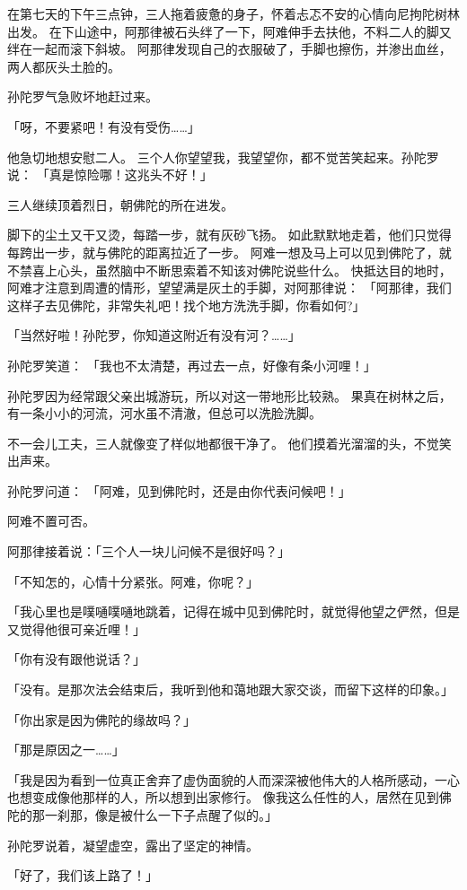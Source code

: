 \documentclass[twoside,openany]{book}
\begin{document}
在第七天的下午三点钟，三人拖着疲惫的身子，怀着忐忑不安的心情向尼拘陀树林出发。
在下山途中，阿那律被石头绊了一下，阿难伸手去扶他，不料二人的脚又绊在一起而滚下斜坡。
阿那律发现自己的衣服破了，手脚也擦伤，并渗出血丝，两人都灰头土脸的。

孙陀罗气急败坏地赶过来。

「呀，不要紧吧！有没有受伤……」

他急切地想安慰二人。
三个人你望望我，我望望你，都不觉苦笑起来。孙陀罗说：
「真是惊险哪！这兆头不好！」

三人继续顶着烈日，朝佛陀的所在进发。

脚下的尘土又干又烫，每踏一步，就有灰砂飞扬。
如此默默地走着，他们只觉得每跨出一步，就与佛陀的距离拉近了一步。
阿难一想及马上可以见到佛陀了，就不禁喜上心头，虽然脑中不断思索着不知该对佛陀说些什么。
快抵达目的地时，阿难才注意到周遭的情形，望望满是灰土的手脚，对阿那律说：
「阿那律，我们这样子去见佛陀，非常失礼吧！找个地方洗洗手脚，你看如何?」

「当然好啦！孙陀罗，你知道这附近有没有河？……」

孙陀罗笑道：
「我也不太清楚，再过去一点，好像有条小河哩！」

孙陀罗因为经常跟父亲出城游玩，所以对这一带地形比较熟。
果真在树林之后，有一条小小的河流，河水虽不清澈，但总可以洗脸洗脚。

不一会儿工夫，三人就像变了样似地都很干净了。
他们摸着光溜溜的头，不觉笑出声来。

孙陀罗问道：
「阿难，见到佛陀时，还是由你代表问候吧！」

阿难不置可否。

阿那律接着说：「三个人一块儿问候不是很好吗？」

「不知怎的，心情十分紧张。阿难，你呢？」

「我心里也是噗嗵噗嗵地跳着，记得在城中见到佛陀时，就觉得他望之俨然，但是又觉得他很可亲近哩！」

「你有没有跟他说话？」

「没有。是那次法会结束后，我听到他和蔼地跟大家交谈，而留下这样的印象。」

「你出家是因为佛陀的缘故吗？」

「那是原因之一……」

「我是因为看到一位真正舍弃了虚伪面貌的人而深深被他伟大的人格所感动，一心也想变成像他那样的人，所以想到出家修行。
像我这么任性的人，居然在见到佛陀的那一刹那，像是被什么一下子点醒了似的。」

孙陀罗说着，凝望虚空，露出了坚定的神情。

「好了，我们该上路了！」
\end{document}
